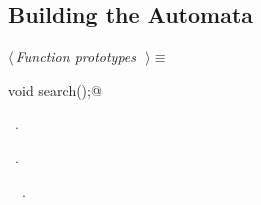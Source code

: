 \documentclass{report}
\begin{document}
\subsection{Building the Automata}


\begin{flushleft} \small
\begin{minipage}{\linewidth} \label{scrap218}
$\langle\,${\it Function prototypes}\nobreak\ {\footnotesize {}}$\,\rangle\equiv$
\vspace{-1ex}
\begin{list}{}{} \item
\mbox{}\verb@extern void search();@\\
\mbox{}\verb@@{\NWsep}
\end{list}
\vspace{-1ex}
\footnotesize\addtolength{\baselineskip}{-1ex}
\begin{list}{}{\setlength{\itemsep}{-\parsep}\setlength{\itemindent}{-\leftmargin}}
\item \NWtxtMacroDefBy\ .
\item \NWtxtMacroRefIn\ .
\end{list}
\vspace{-2ex}
\footnotesize\addtolength{\baselineskip}{-1ex}
\begin{list}{}{\setlength{\itemsep}{-\parsep}\setlength{\itemindent}{-\leftmargin}}
\item \NWtxtIdentsUsed\nobreak\  \verb@search@\nobreak\ .\end{list}
\end{minipage}\\[4ex]
\end{flushleft}
\end{document}
